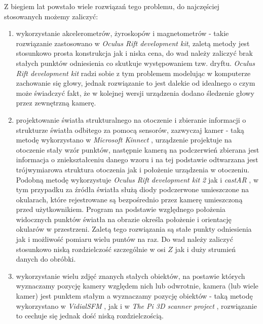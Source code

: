Z biegiem lat powstało wiele rozwiązań tego problemu, do najczęściej stosowanych możemy zaliczyć:
\begin{enumerate}
 \item 
 wykorzystanie akcelerometrów, żyroskopów i magnetometrów - 
takie rozwiązanie zastosowano w \textit{Oculus Rift development kit}, zaletą metody jest stosunkowo
prosta konstrukcja jak i niska cena,
do wad należy zaliczyć brak stałych punktów odniesienia co skutkuje występowaniem tzw. dryftu.
\textit{Oculus Rift development kit} radzi sobie z tym problemem modelując w komputerze zachowanie się głowy,
jednak rozwiązanie to jest dalekie od idealnego o czym może świadczyć fakt, że w kolejnej wersji 
urządzenia dodano śledzenie głowy przez zewnętrzną kamerę.

\item \label{itm:second_method}
 projektowanie światła strukturalnego na otoczenie i zbieranie informacji o strukturze 
 światła odbitego za pomocą sensorów, zazwyczaj kamer - taką metodę wykorzystano w \textit{Microsoft Kinnect} \cite{bib:MicrosoftKinect},
 urządzenie projektuje na otoczenie stały wzór punktów, następnie kamerą na podczerwień
 zbierana jest informacja o zniekształceniu danego wzoru i na tej podstawie odtwarzana jest 
 trójwymiarowa struktura otoczenia jak i położenie urządzenia w otoczeniu.
 Podobną metodę wykorzystuje \textit{Oculus Rift development kit 2} \cite{bib:OculusRiftDK2} jak i 
 \textit{castAR} \cite{bib:castAR}, w tym przypadku za źródła światła służą diody podczerwone umieszczone na okularach, które
 rejestrowane są bezpośrednio przez kamerę umieszczoną przed użytkownikiem.
 Program na podstawie względnego położenia widocznych punktów światła na obrazie określa położenie i orientację
 okularów w przestrzeni.
 Zaletą tego rozwiązania są stałe punkty odniesienia jak i możliwość pomiaru wielu puntów na raz.
 Do wad należy zaliczyć stosunkowo niską rozdzielczość szczególnie w osi $Z$ jak i duży strumień danych do obróbki.

\item
 wykorzystanie wielu zdjęć znanych stałych obiektów, na postawie których wyznaczamy pozycję kamery względem nich
  lub odwrotnie, kamera (lub wiele kamer) jest punktem stałym a wyznaczamy pozycję obiektów -   
 taką metodę wykorzystano w \textit{VidialSFM} \cite{bib:VisualSFM}, jak i w \textit{The Pi 3D scanner project} \cite{bib:pi3dscan}, 
 rozwiązanie to cechuje się jednak dość niską rozdzielczością.
 
\end{enumerate}
 

